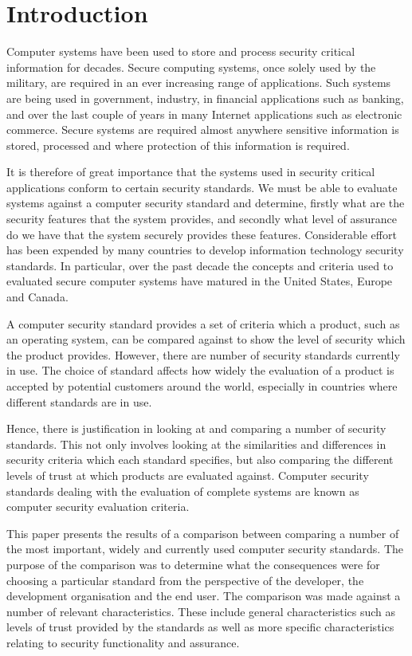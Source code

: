 
\chapter{Introduction}

    Computer systems have been used to store and process security critical information for decades.
    Secure computing systems, once solely used by the military, are required in an ever increasing 
    range of applications. Such systems are being used in government, industry, in financial applications
    such as banking, and over the last couple of years in many Internet applications such as
    electronic commerce. Secure systems are required almost anywhere sensitive information is stored,
    processed and where protection of this information is required.

    It is therefore of great importance that the systems used in security critical applications
    conform to certain security standards. We must be able to evaluate systems against a computer 
    security standard and determine, firstly what are the security features that the system provides,
    and secondly what level of assurance do we have that the system securely provides these features.
    Considerable effort has been expended by many countries to develop information technology security
    standards. In particular, over the past decade the concepts and criteria used to evaluated 
    secure computer systems have matured in the United States, Europe and Canada.

    A computer security standard provides a set of criteria which a 
    product, such as an operating system, can be compared against 
    to show the level of security which the product
    provides. 
    However, there are number of security standards currently in use.
    The choice of standard affects how
    widely the evaluation of a product is accepted by potential customers around
    the world, especially in countries where different standards are in use. 
    
    Hence, there is
    justification in looking at and comparing a number of security
    standards. This not only involves looking at the similarities and
    differences in security criteria which each standard specifies, but
    also comparing the different levels of trust at which products are
    evaluated against. Computer security standards dealing with the
    evaluation of complete systems are known as computer security
    evaluation criteria.
   
    This paper presents the results of a comparison between comparing a number
    of the most important, widely and currently used computer security
    standards. 
    The purpose of the comparison was to determine what the consequences were
    for choosing a particular standard from the perspective of the developer,
    the development organisation and the end user. 
    The comparison was made against a number of relevant characteristics.
    These include general characteristics such as levels of trust provided
    by the standards as well
    as more specific characteristics relating to security functionality and
    assurance.
    
